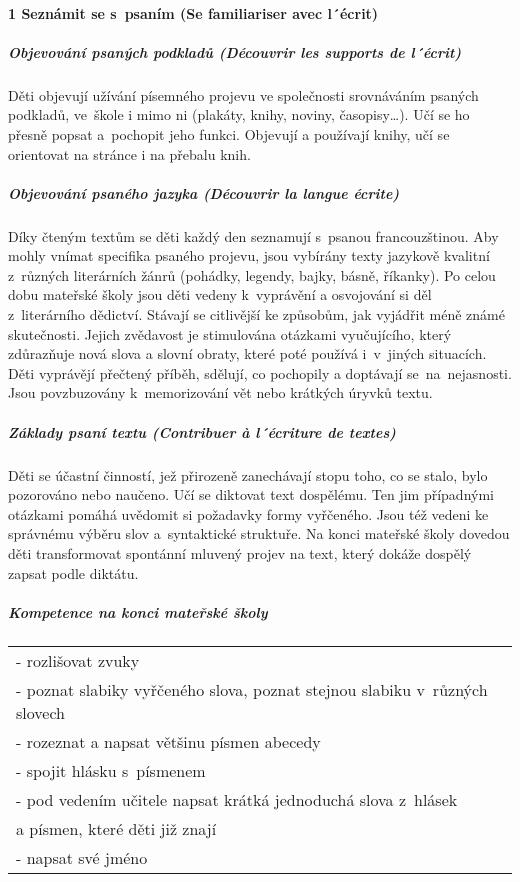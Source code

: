 			\paragraph*{1 Seznámit se s psaním (Se familiariser avec l´écrit)}
				\subparagraph{Objevování psaných podkladů (Découvrir les supports de l´écrit)}
					Děti objevují užívání písemného projevu ve společnosti srovnáváním psaných podkladů, ve škole i mimo ni (plakáty, knihy, noviny, časopisy…). Učí se ho přesně popsat a pochopit jeho funkci. Objevují a používají knihy, učí se orientovat na stránce i na přebalu knih. 
				\subparagraph{Objevování psaného jazyka (Découvrir la langue écrite)}
					Díky čteným textům se děti každý den seznamují s psanou francouzštinou. Aby mohly vnímat specifika psaného projevu, jsou vybírány texty jazykově kvalitní z různých literárních žánrů (pohádky, legendy, bajky, básně, říkanky). Po celou dobu mateřské školy jsou děti vedeny k vyprávění a osvojování si děl z literárního dědictví. Stávají se citlivější ke způsobům, jak vyjádřit méně známé skutečnosti. Jejich zvědavost je stimulována otázkami vyučujícího, který zdůrazňuje nová slova a slovní obraty, které poté používá i v jiných situacích.  Děti vyprávějí přečtený příběh, sdělují, co pochopily a doptávají se na nejasnosti. Jsou povzbuzovány k memorizování vět nebo krátkých úryvků textu. 
				\subparagraph{Základy psaní textu (Contribuer à l´écriture de textes)}
					Děti se účastní činností, jež přirozeně zanechávají stopu toho, co se stalo, bylo pozorováno nebo naučeno. Učí se diktovat text dospělému. Ten jim případnými otázkami pomáhá uvědomit si požadavky formy vyřčeného. Jsou též vedeni ke správnému výběru slov a syntaktické struktuře. Na konci mateřské školy dovedou děti transformovat spontánní mluvený projev na text, který dokáže dospělý zapsat podle diktátu.
				\subparagraph{Kompetence na konci mateřské školy \hspace{3cm}}
				\begin{center}
				\begin{tabular}{l}
					- rozlišovat zvuky 	\\
					- poznat slabiky vyřčeného slova, poznat stejnou slabiku v různých slovech 	\\
					- rozeznat a napsat většinu písmen abecedy 	\\
					- spojit hlásku s písmenem 	\\
					- pod vedením učitele napsat krátká jednoduchá slova z hlásek \\
					 \; a písmen, které děti již znají 	\\
					- napsat své jméno
				\end{tabular}
				\end{center}


